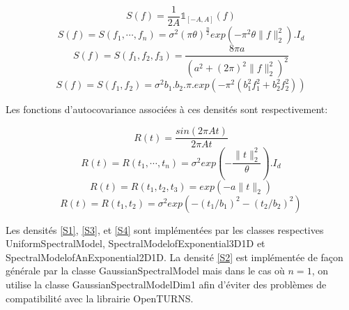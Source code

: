 \begin{equation} S(f) = \frac{1}{2A} \mathds{1}_{[-A,A]}(f) \tag{S1} \label{S1}\end{equation}
\begin{equation} S(f) = S(f_1,\cdots,f_n) = \sigma^{2} (\pi \theta)^{\frac{n}{2}} exp(-\pi^{2} \theta \|f\|_{2}^{2}) . I_{d} \tag{S2}\label{S2}\end{equation}
\begin{equation} S(f) = S(f_1,f_2,f_3) = \frac{8\pi a}{(a^2 +(2\pi)^{2} \|f\|_{2}^{2})^{2}} \tag{S3}\label{S3}\end{equation}
\begin{equation} S(f) = S(f_1,f_2) = \sigma^2 b_1.b_2.\pi.exp(-\pi^2 (b_1^2 f_1^2 + b_2^2 f_2^2) ) \tag{S4}\label{S4}\end{equation}

\noindent Les fonctions d'autocovariance associées à ces densités sont respectivement:

\begin{equation} R(t) = \frac{sin(2\pi A t)}{2\pi A t}  \tag{R1}\label{R1} \end{equation}
\begin{equation} R(t) = R(t_1,\cdots,t_n) = \sigma^{2} exp(- \frac{\|t\|_{2}^{2}}{\theta}) . I_{d} \tag{R2}\label{R2}\end{equation}
\begin{equation} R(t) = R(t_1,t_2,t_3) = exp(-a \|t\|_{2})  \tag{R3}\label{R3}\end{equation}
\begin{equation} R(t) = R(t_1,t_2) = \sigma^2 exp(-(t_1/b_1)^{2} - (t_2/b_2)^{2}) \tag{R4}\label{R4}\end{equation}


\noindent Les densités \eqref{S1}, \eqref{S3}, et \eqref{S4} sont implémentées par les classes respectives
UniformSpectralModel, SpectralModelofExponential3D1D et SpectralModelofAnExponential2D1D. La densité
\eqref{S2} est implémentée de façon générale par la classe GaussianSpectralModel mais dans
le cas où $n=1$, on utilise la classe GaussianSpectralModelDim1 afin d'éviter des problèmes
de compatibilité avec la librairie OpenTURNS.\\

